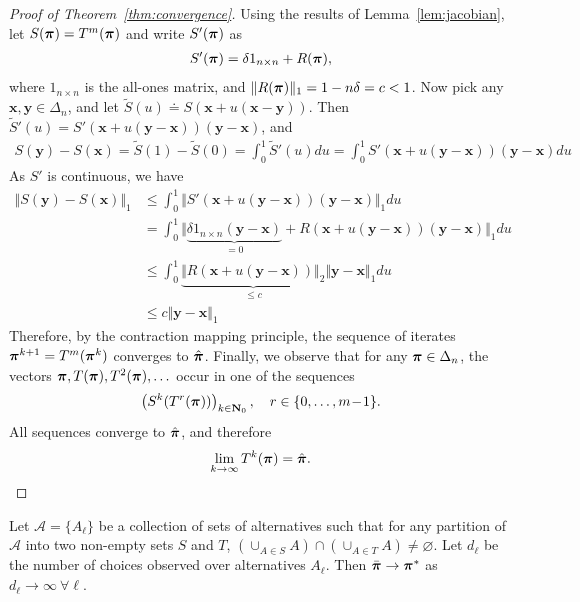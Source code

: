 \begin{proof}[Proof of Theorem~\ref{thm:convergence}]
Using the results of Lemma~\ref{lem:jacobian}, let $S(\bm{\pi}) = T^m(\bm{\pi})$ and write $S'(\bm{\pi})$ as
\begin{align}
S'(\bm{\pi}) = \delta 1_{n \times n} + R(\bm{\pi}),
\end{align}
where $1_{n \times n}$ is the all-ones matrix, and $\Vert R(\bm{\pi}) \Vert_1 = 1 - n\delta = c < 1$.
Now pick any $\bm{x}, \bm{y} \in \Delta_n$, and let $\tilde{S}(u) \doteq S(\bm{x} + u(\bm{x} - \bm{y}))$.
Then $\tilde{S}'(u) = S'(\bm{x} + u(\bm{y} - \bm{x}))(\bm{y} - \bm{x})$, and
\begin{align}
S(\bm{y}) - S(\bm{x}) = \tilde{S}(1) - \tilde{S}(0) = \int_0^1 \tilde{S}'(u) du = \int_0^1 S'(\bm{x} + u(\bm{y} - \bm{x}))(\bm{y} - \bm{x}) du
\end{align}
As $S'$ is continuous, we have
\begin{align}
\Vert S(\bm{y}) - S(\bm{x}) \Vert_1 &\le \int_0^1 \Vert S'(\bm{x} + u(\bm{y} - \bm{x}))(\bm{y} - \bm{x}) \Vert_1 du \\
&=   \int_0^1 \Vert \underbrace{\delta 1_{n \times n}(\bm{y} - \bm{x})}_{= 0} + R(\bm{x} + u(\bm{y} - \bm{x}))(\bm{y} - \bm{x}) \Vert_1 du \\
&\le \int_0^1 \underbrace{\Vert R(\bm{x} + u(\bm{y} - \bm{x})) \Vert_2}_{\le c} \Vert \bm{y} - \bm{x} \Vert_1 du \\
&\le c \Vert \bm{y} - \bm{x} \Vert_1
\end{align}
Therefore, by the contraction mapping principle, the sequence of iterates $\bm{\pi}^{k+1} = T^m(\bm{\pi}^k)$ converges to $\hat{\bm{\pi}}$.
Finally, we observe that for any $\bm{\pi} \in \Delta_n$, the vectors $\bm{\pi}, T(\bm{\pi}), T^2(\bm{\pi}), \ldots$ occur in one of the sequences
\begin{align}
\left( S^k(T^r(\bm{\pi})) \right)_{k \in \mathbf{N}_0}, \quad r \in \{ 0, \ldots, m\!-\!1 \}.
\end{align}
All sequences converge to $\hat{\bm{\pi}}$, and therefore
\begin{align}
\lim_{k \to \infty} T^k(\bm{\pi}) = \hat{\bm{\pi}}.
\end{align}
\end{proof}

\begin{theorem}
\label{thm:consistency}
Let $\mathcal{A} = \{ A_\ell \}$ be a collection of sets of alternatives such that for any partition of $\mathcal{A}$ into two non-empty sets $S$ and $T$, $\left( \cup_{A \in S} A \right) \cap \left( \cup_{A \in T} A \right) \ne \varnothing$.
Let $d_\ell$ be the number of choices observed over alternatives $A_\ell$.
Then $\bar{\bm{\pi}} \to \bm{\pi}^*$ as $d_\ell \to \infty \ \forall \ell$.
\end{theorem}

